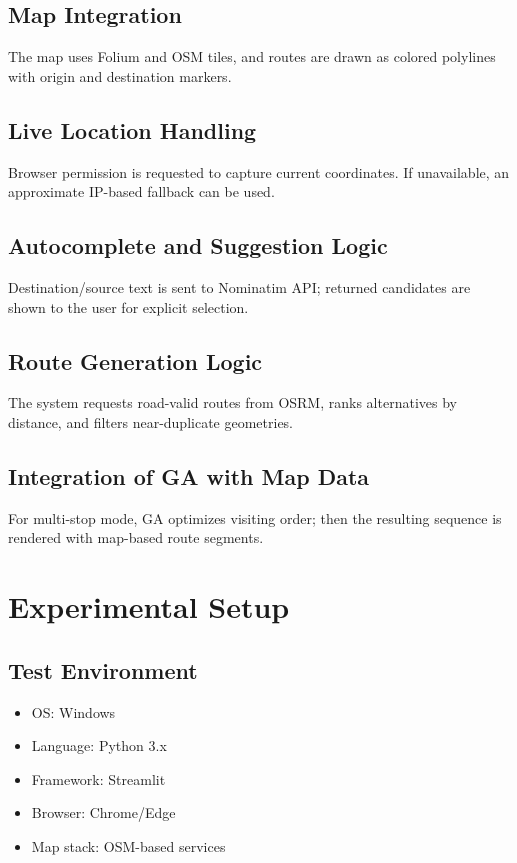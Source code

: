 \documentclass[12pt,a4paper]{report}
\begin{document}
\section{Map Integration}
The map uses Folium and OSM tiles, and routes are drawn as colored polylines with origin and destination markers.

\section{Live Location Handling}
Browser permission is requested to capture current coordinates. If unavailable, an approximate IP-based fallback can be used.

\section{Autocomplete and Suggestion Logic}
Destination/source text is sent to Nominatim API; returned candidates are shown to the user for explicit selection.

\section{Route Generation Logic}
The system requests road-valid routes from OSRM, ranks alternatives by distance, and filters near-duplicate geometries.

\section{Integration of GA with Map Data}
For multi-stop mode, GA optimizes visiting order; then the resulting sequence is rendered with map-based route segments.

\chapter{Experimental Setup}

\section{Test Environment}
\begin{itemize}
    \item OS: Windows
    \item Language: Python 3.x
    \item Framework: Streamlit
    \item Browser: Chrome/Edge
    \item Map stack: OSM-based services
\end{itemize}
\end{document}
